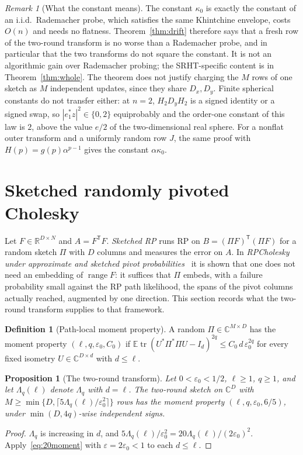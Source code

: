 \documentclass[11pt,a4paper]{article}
\newtheorem{proposition}[theorem]{Proposition}
\theoremstyle{definition}
\newtheorem{definition}[theorem]{Definition}
\theoremstyle{remark}
\newtheorem{remark}[theorem]{Remark}
\numberwithin{equation}{section}
\newcommand{\E}{\mathbb E}
\newcommand{\R}{\mathbb R}
\newcommand{\C}{\mathbb C}
\newcommand{\tr}{\operatorname{tr}}
\newcommand{\range}{\operatorname{range}}
\newcommand{\eps}{\varepsilon}
\begin{document}
\begin{remark}[What the constant means]
The constant $\kappa_0$ is exactly the constant of an i.i.d.\ Rademacher probe,
which satisfies the same Khintchine envelope, costs $O(n)$ and needs no
flatness. Theorem~\ref{thm:drift} therefore says that a fresh row of the
two-round transform is no worse than a Rademacher probe, and in particular that
the two transforms do not square the constant. It is not an algorithmic gain
over Rademacher probing; the SRHT-specific content is in
Theorem~\ref{thm:whole}. The theorem does not justify charging the $M$ rows of
one sketch as $M$ independent updates, since they share $D_x,D_y$. Finite
spherical constants do not transfer either: at $n=2$, $H_2D_yH_2$ is a signed
identity or a signed swap, so $|e_1^*z|^2\in\{0,2\}$ equiprobably and the
order-one constant of this law is $2$, above the value $e/2$ of the
two-dimensional real sphere. For a nonflat outer transform and a uniformly random
row $J$, the same proof with $H(p)=g(p)\alpha^{p-1}$ gives the constant
$\alpha\kappa_0$.
\end{remark}

\section{Sketched randomly pivoted Cholesky}\label{sec:sketchedrp}

Let $F\in\R^{D\times N}$ and $A=F^{\mathsf T}F$. \emph{Sketched RP} runs RP on
$B=(\Pi F)^{\mathsf T}(\Pi F)$ for a random sketch $\Pi$ with $D$ columns and
measures the error on $A$. In \emph{RPCholesky under approximate and sketched
pivot probabilities}~\cite{RobustRP} it is shown that one does not need an
embedding of $\range F$: it suffices that $\Pi$ embeds, with a failure
probability small against the RP path likelihood, the spans of the pivot columns
actually reached, augmented by one direction. This section records what the
two-round transform supplies to that framework.

\begin{definition}[Path-local moment property]
A random $\Pi\in\C^{M\times D}$ has the moment property $(\ell,q,\eps_0,C_0)$ if
$\E\tr(U^*\Pi^*\Pi U-I_d)^{2q}\le C_0\,d\,\eps_0^{2q}$ for every fixed isometry
$U\in\C^{D\times d}$ with $d\le\ell$.
\end{definition}

\begin{proposition}[The two-round transform]\label{prop:pathlocal}
Let $0<\eps_0<1/2$, $\ell\ge1$, $q\ge1$, and let $\Lambda_q(\ell)$ denote
$\Lambda_q$ with $d=\ell$. The two-round sketch on $\C^D$ with
$M\ge\min\{D,\lceil5\Lambda_q(\ell)/\eps_0^2\rceil\}$ rows has the moment property
$(\ell,q,\eps_0,6/5)$, under $\min(D,4q)$-wise independent signs.
\end{proposition}
\begin{proof}
$\Lambda_q$ is increasing in $d$, and $5\Lambda_q(\ell)/\eps_0^2=20\Lambda_q(\ell)/(2\eps_0)^2$.
Apply~\eqref{eq:20moment} with $\eps=2\eps_0<1$ to each $d\le\ell$.
\end{proof}
\end{document}
